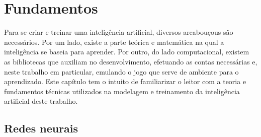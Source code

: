 %




\chapter{Fundamentos}
\label{cap:fundamentos}

Para se criar e treinar uma inteligência artificial, diversos arcabouçous são necessários.
Por um lado, existe a parte teórica e matemática na qual a inteligência se baseia para aprender. 
Por outro, do lado computacional, existem as bibliotecas que auxiliam no desenvolvimento, efetuando as contas necessárias e, neste trabalho em particular, emulando o jogo que serve de ambiente para o aprendizado.
Este capítulo tem o intuito de familiarizar o leitor com a teoria e fundamentos técnicas utilizados na modelagem e treinamento da inteligência artificial deste trabalho.


\section{Redes neurais}
\label{sec:nn}

